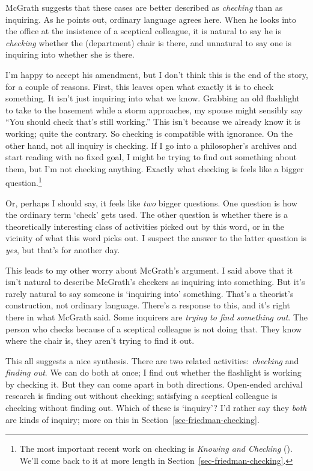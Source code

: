\documentclass[
  11pt,
  letterpaper,
  DIV=11,
  numbers=noendperiod,
  twoside]{scrartcl}
\begin{document}
McGrath suggests that these cases are better described as
\emph{checking} than as inquiring. As he points out, ordinary language
agrees here. When he looks into the office at the insistence of a
sceptical colleague, it is natural to say he is \emph{checking} whether
the (department) chair is there, and unnatural to say one is inquiring
into whether she is there.

I'm happy to accept his amendment, but I don't think this is the end of
the story, for a couple of reasons. First, this leaves open what exactly
it is to check something. It isn't just inquiring into what we know.
Grabbing an old flashlight to take to the basement while a storm
approaches, my spouse might sensibly say ``You should check that's still
working.'' This isn't because we already know it is working; quite the
contrary. So checking is compatible with ignorance. On the other hand,
not all inquiry is checking. If I go into a philosopher's archives and
start reading with no fixed goal, I might be trying to find out
something about them, but I'm not checking anything. Exactly what
checking is feels like a bigger question.\footnote{The most important
  recent work on checking is \emph{Knowing and Checking}
  (). We'll come back to it at
  more length in Section~\ref{sec-friedman-checking}.}

Or, perhaps I should say, it feels like \emph{two} bigger questions. One
question is how the ordinary term `check' gets used. The other question
is whether there is a theoretically interesting class of activities
picked out by this word, or in the vicinity of what this word picks out.
I suspect the answer to the latter question is \emph{yes}, but that's
for another day.

This leads to my other worry about McGrath's argument. I said above that
it isn't natural to describe McGrath's checkers as inquiring into
something. But it's rarely natural to say someone is `inquiring into'
something. That's a theorist's construction, not ordinary language.
There's a response to this, and it's right there in what McGrath said.
Some inquirers are \emph{trying to find something out}. The person who
checks because of a sceptical colleague is not doing that. They know
where the chair is, they aren't trying to find it out.

This all suggests a nice synthesis. There are two related activities:
\emph{checking} and \emph{finding out}. We can do both at once; I find
out whether the flashlight is working by checking it. But they can come
apart in both directions. Open-ended archival research is finding out
without checking; satisfying a sceptical colleague is checking without
finding out. Which of these is `inquiry'? I'd rather say they
\emph{both} are kinds of inquiry; more on this in
Section~\ref{sec-friedman-checking}.
\end{document}
